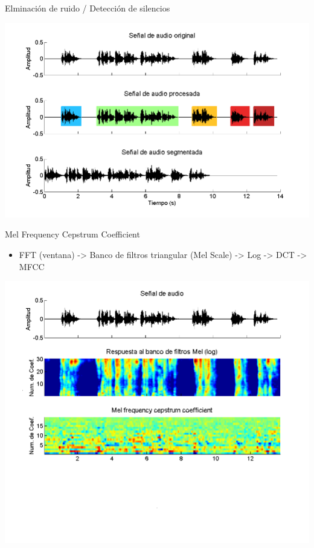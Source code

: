 \begin{frame}{Elminación de ruido / Detección de silencios}
  \begin{center}
    \includegraphics[width=1\textwidth]{gfx/f-silence}
  \end{center}
\end{frame}


\begin{frame}{Mel Frequency Cepstrum Coefficient}
  \begin{itemize}
    \item \small{FFT (ventana) -> Banco de filtros triangular (Mel Scale) -> Log -> DCT -> MFCC}
  \end{itemize} 
  \begin{center}
    \includegraphics[width=1\textwidth]{gfx/f-mfcc}
  \end{center}
\end{frame}